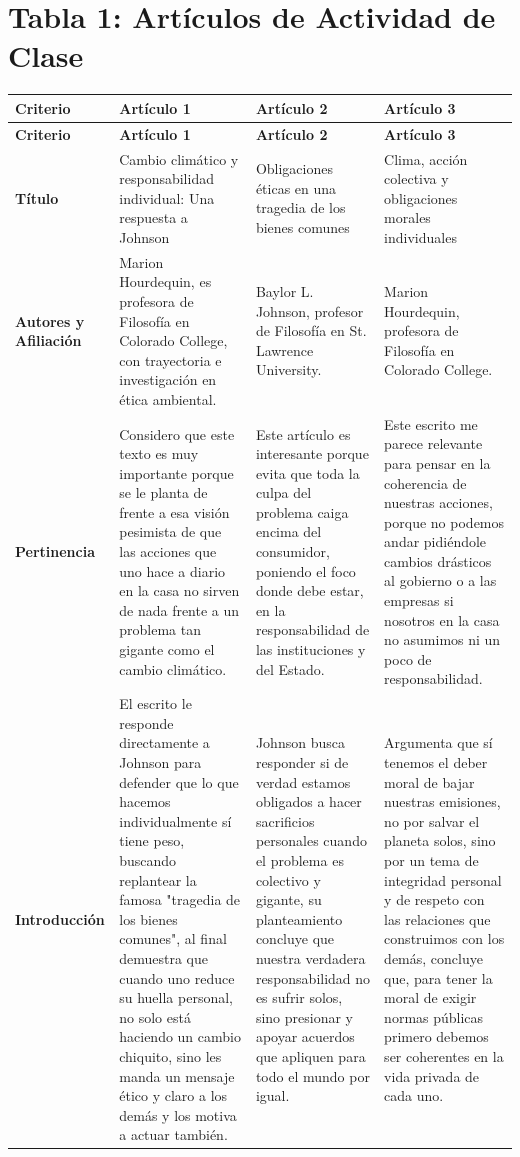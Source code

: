 \documentclass[12pt]{article}
\begin{document}
\section*{Tabla 1: Artículos de Actividad de Clase}

\begin{longtable}{|>{\raggedright\arraybackslash}p{3cm}|>{\raggedright\arraybackslash}p{4.2cm}|>{\raggedright\arraybackslash}p{4.2cm}|>{\raggedright\arraybackslash}p{4.2cm}|}
\hline
\textbf{Criterio} & \textbf{Artículo 1} & \textbf{Artículo 2} & \textbf{Artículo 3} \\
\hline
\endfirsthead

\hline
\textbf{Criterio} & \textbf{Artículo 1} & \textbf{Artículo 2} & \textbf{Artículo 3} \\
\hline
\endhead

\textbf{Título} & Cambio climático y responsabilidad individual: Una respuesta a Johnson & Obligaciones éticas en una tragedia de los bienes comunes & Clima, acción colectiva y obligaciones morales individuales \\
\hline
\textbf{Autores y Afiliación} & Marion Hourdequin, es profesora de Filosofía en Colorado College, con trayectoria e investigación en ética ambiental. & Baylor L. Johnson, profesor de Filosofía en St. Lawrence University. & Marion Hourdequin, profesora de Filosofía en Colorado College. \\
\hline
\textbf{Pertinencia} & Considero que este texto es muy importante porque se le planta de frente a esa visión pesimista de que las acciones que uno hace a diario en la casa no sirven de nada frente a un problema tan gigante como el cambio climático. & Este artículo es interesante porque evita que toda la culpa del problema caiga encima del consumidor, poniendo el foco donde debe estar, en la responsabilidad de las instituciones y del Estado. & Este escrito me parece relevante para pensar en la coherencia de nuestras acciones, porque no podemos andar pidiéndole cambios drásticos al gobierno o a las empresas si nosotros en la casa no asumimos ni un poco de responsabilidad. \\
\hline
\textbf{Introducción} & El escrito le responde directamente a Johnson para defender que lo que hacemos individualmente sí tiene peso, buscando replantear la famosa "tragedia de los bienes comunes", al final demuestra que cuando uno reduce su huella personal, no solo está haciendo un cambio chiquito, sino les manda un mensaje ético y claro a los demás y los motiva a actuar también. & Johnson busca responder si de verdad estamos obligados a hacer sacrificios personales cuando el problema es colectivo y gigante, su planteamiento concluye que nuestra verdadera responsabilidad no es sufrir solos, sino presionar y apoyar acuerdos que apliquen para todo el mundo por igual. & Argumenta que sí tenemos el deber moral de bajar nuestras emisiones, no por salvar el planeta solos, sino por un tema de integridad personal y de respeto con las relaciones que construimos con los demás, concluye que, para tener la moral de exigir normas públicas primero debemos ser coherentes en la vida privada de cada uno. \\

\end{longtable}
\end{document}
